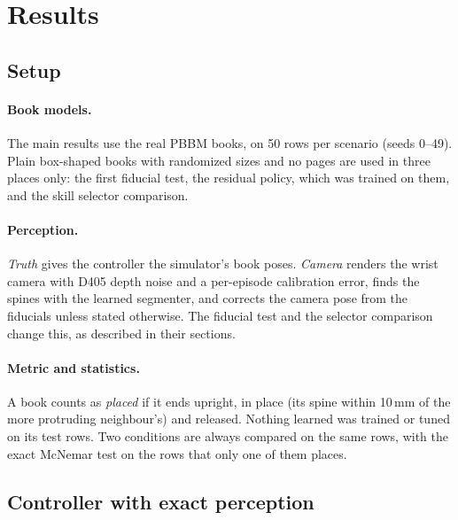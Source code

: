 \documentclass{article}
\begin{document}
\section{Results}

\subsection{Setup}
\paragraph{Book models.} The main results use the real PBBM books, on 50 rows per scenario (seeds 0--49).
Plain box-shaped books with randomized sizes and no pages are used in three places only: the first
fiducial test, the residual policy, which was trained on them, and the skill selector comparison.

\paragraph{Perception.} \emph{Truth} gives the controller the simulator's book poses. \emph{Camera} renders
the wrist camera with D405 depth noise and a per-episode calibration error, finds the spines with the
learned segmenter, and corrects the camera pose from the fiducials unless stated otherwise. The fiducial
test and the selector comparison change this, as described in their sections.

\paragraph{Metric and statistics.} A book counts as \emph{placed} if it ends upright, in place (its spine
within 10\,mm of the more protruding neighbour's) and released. Nothing learned was trained or tuned on
its test rows. Two conditions are always compared on the same rows, with the exact McNemar test on the
rows that only one of them places.

\subsection{Controller with exact perception}
\end{document}
